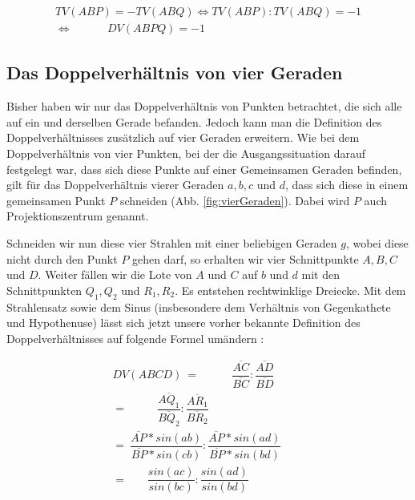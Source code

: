 \documentclass[12pt,a4paper]{article}
\begin{document}
\begin{equation*}
\begin{split}
TV(A B P) = -TV(A B Q) \Longleftrightarrow TV(A B P) : TV(A B Q) = -1 \\ \Longleftrightarrow ~~~~~~~~~~~~~~DV(A B P Q) = -1
\end{split}
\end{equation*}

\subsection{Das Doppelverhältnis von vier Geraden}

Bisher haben wir nur das Doppelverhältnis von Punkten betrachtet, die sich alle auf ein und derselben Gerade befanden. Jedoch kann man die Definition des Doppelverhältnisses zusätzlich auf vier Geraden erweitern. Wie bei dem Doppelverhältnis von vier Punkten, bei der die Ausgangssituation darauf festgelegt war, dass sich diese Punkte auf einer Gemeinsamen Geraden befinden, gilt für das Doppelverhältnis vierer Geraden $a, b, c$ und $d$, dass sich diese in einem gemeinsamen Punkt $P$ schneiden (Abb. \ref{fig:vierGeraden}). Dabei wird $P$ auch Projektionszentrum genannt.

Schneiden wir nun diese vier Strahlen mit einer beliebigen Geraden $g$, wobei diese nicht durch den Punkt $P$ gehen darf, so erhalten wir vier Schnittpunkte $A, B, C$ und $D$. Weiter fällen wir die Lote von $A$ und $C$ auf $b$ und $d$ mit den Schnittpunkten $Q_1, Q_2$ und $R_1, R_2$. Es entstehen rechtwinklige Dreiecke. Mit dem Strahlensatz sowie dem Sinus (insbesondere dem Verhältnis von Gegenkathete und Hypothenuse) lässt sich jetzt unsere vorher bekannte Definition des Doppelverhältnisses auf folgende Formel umändern \citep[s.~][S.~80]{projektiveGeometrie}: 

\begin{equation*}
\begin{split}
DV(A B C D)~=~~~~~~~~~~~~~\dfrac{\overline{A C}}{\overline{B C}} : \dfrac{\overline{A D}}{\overline{B D}}~~~~~~~~~~~~\\
=~~~~~~~~~~~~\dfrac{\overline{A Q_1}}{\overline{B Q_2}} : \dfrac{\overline{A R_1}}{\overline{B R_2}}~~~~~~~~~~~\\
=~\dfrac{\overline{A P} * sin(ab)}{\overline{B P} * sin(cb)} : \dfrac{\overline{A P} * sin(ad)}{\overline{B P} * sin(bd)} \\
=~~~~~~~~\dfrac{sin(ac)}{sin(bc)} : \dfrac{sin(ad)}{sin(bd)}~~~~~~~~
\end{split}
\end{equation*}
\end{document}
